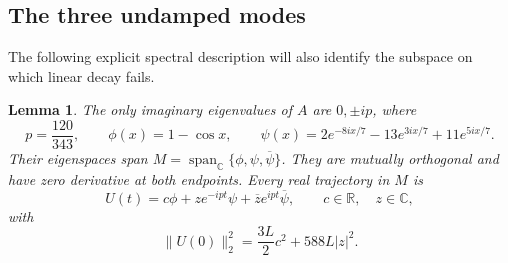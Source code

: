 \documentclass[11pt]{article}
\newtheorem{lemma}[theorem]{Lemma}
\theoremstyle{remark}\newtheorem{remark}[theorem]{Remark}
\numberwithin{equation}{section}
\begin{document}
\subsection{The three undamped modes}
The following explicit spectral description will also identify the subspace
on which linear decay fails.
\begin{lemma}\label{lem:modes}
The only imaginary eigenvalues of $A$ are $0,\pm ip$, where
\begin{equation}\label{eq:modes}
 p=\frac{120}{343},\qquad \phi(x)=1-\cos x,\qquad
 \psi(x)=2e^{-8ix/7}-13e^{3ix/7}+11e^{5ix/7}.
\end{equation}
Their eigenspaces span $M=\operatorname{span}_{\mathbb C}\{\phi,\psi,\overline\psi\}$.
They are mutually orthogonal and have zero derivative at both endpoints.
Every real trajectory in $M$ is
\begin{equation}\label{eq:U}
 U(t)=c\phi+ze^{-ipt}\psi+\overline z e^{ipt}\overline\psi,
 \qquad c\in\mathbb R,\quad z\in\mathbb C,
\end{equation}
with
\begin{equation}\label{eq:center-norm}
 \|U(0)\|_2^2=\frac{3L}{2}c^2+588L|z|^2.
\end{equation}
\end{lemma}
\end{document}
